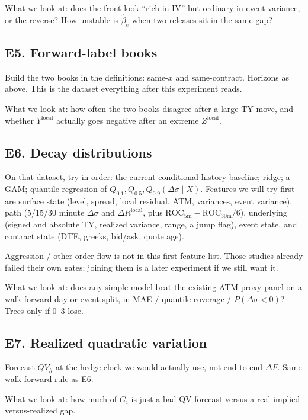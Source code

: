 \documentclass[11pt]{article}
\begin{document}
What we look at: does the front look ``rich in IV'' but ordinary in
event variance, or the reverse?  How unstable is \(\hat\beta_e\)
when two releases sit in the same gap?

\subsection{E5. Forward-label books}

Build the two books in the definitions: same-\(x\) and
same-contract.  Horizons as above.  This is the dataset everything
after this experiment reads.

What we look at: how often the two books disagree after a large TY
move, and whether \(Y^{\mathrm{local}}\) actually goes negative
after an extreme \(Z^{\mathrm{local}}\).

\subsection{E6. Decay distributions}

On that dataset, try in order: the current conditional-history
baseline; ridge; a GAM; quantile regression of
\(Q_{0.1},Q_{0.5},Q_{0.9}(\Delta\sigma\mid X)\).  Features we will
try first are surface state (level, spread, local residual, ATM,
variances, event variance), path (5/15/30 minute
\(\Delta\sigma\) and \(\Delta R^{\mathrm{local}}\), plus
\(\mathrm{ROC}_{5\mathrm{m}}-\mathrm{ROC}_{30\mathrm{m}}/6\)),
underlying (signed and absolute TY, realized variance, range, a
jump flag), event state, and contract state (DTE, greeks, bid/ask,
quote age).

Aggression / other order-flow is not in this first feature list.
Those studies already failed their own gates; joining them is a
later experiment if we still want it.

What we look at: does any simple model beat the existing ATM-proxy
panel on a walk-forward day or event split, in MAE / quantile
coverage / \(P(\Delta\sigma<0)\)?  Trees only if 0--3 lose.

\subsection{E7. Realized quadratic variation}

Forecast \(QV_h\) at the hedge clock we would actually use, not
end-to-end \(\Delta F\).  Same walk-forward rule as E6.

What we look at: how much of \(G_i\) is just a bad QV forecast
versus a real implied-versus-realized gap.
\end{document}
